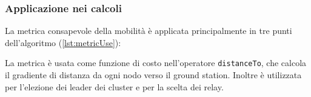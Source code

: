 

\newpage

\subsubsection{Applicazione nei calcoli}
\label{applicazione_calcoli}

La metrica consapevole della mobilità è applicata principalmente in tre punti dell'algoritmo (\cref{lst:metricUse}):



\newpage

La metrica è usata come funzione di costo nell'operatore \texttt{distanceTo}, che calcola il gradiente di distanza da ogni nodo verso il ground station. Inoltre è utilizzata per l'elezione dei leader dei cluster e per la scelta dei relay.
